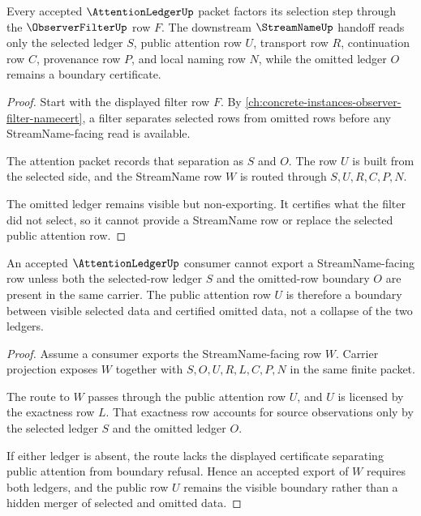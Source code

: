 \begin{theorem}
\label{thm:attention-ledger-observer-filter-handoff}
Every accepted $\AttentionLedgerUp$ packet factors its selection step through the $\ObserverFilterUp$ row $F$. The downstream $\StreamNameUp$ handoff reads only the selected ledger $S$, public attention row $U$, transport row $R$, continuation row $C$, provenance row $P$, and local naming row $N$, while the omitted ledger $O$ remains a boundary certificate.
\end{theorem}
\begin{proof}
Start with the displayed filter row $F$. By \autoref{ch:concrete-instances-observer-filter-namecert}, a filter separates selected rows from omitted rows before any StreamName-facing read is available.

The attention packet records that separation as $S$ and $O$. The row $U$ is built from the selected side, and the StreamName row $W$ is routed through $S,U,R,C,P,N$.

The omitted ledger remains visible but non-exporting. It certifies what the filter did not select, so it cannot provide a StreamName row or replace the selected public attention row.
\end{proof}

\begin{theorem}
\label{thm:attention-ledger-public-boundary}
An accepted $\AttentionLedgerUp$ consumer cannot export a StreamName-facing row unless both the selected-row ledger $S$ and the omitted-row boundary $O$ are present in the same carrier. The public attention row $U$ is therefore a boundary between visible selected data and certified omitted data, not a collapse of the two ledgers.
\end{theorem}
\begin{proof}
Assume a consumer exports the StreamName-facing row $W$. Carrier projection exposes $W$ together with $S,O,U,R,L,C,P,N$ in the same finite packet.

The route to $W$ passes through the public attention row $U$, and $U$ is licensed by the exactness row $L$. That exactness row accounts for source observations only by the selected ledger $S$ and the omitted ledger $O$.

If either ledger is absent, the route lacks the displayed certificate separating public attention from boundary refusal. Hence an accepted export of $W$ requires both ledgers, and the public row $U$ remains the visible boundary rather than a hidden merger of selected and omitted data.
\end{proof}

